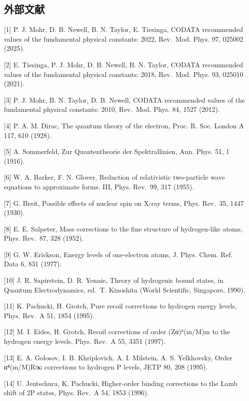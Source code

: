 \documentclass[
  a4paper,
]{ltjsarticle}
\begin{document}
\subsection{外部文献}\label{ux5916ux90e8ux6587ux732e}

{[}1{]} P. J. Mohr, D. B. Newell, B. N. Taylor, E. Tiesinga, CODATA
recommended values of the fundamental physical constants: 2022,
Rev.~Mod. Phys. 97, 025002 (2025).

{[}2{]} E. Tiesinga, P. J. Mohr, D. B. Newell, B. N. Taylor, CODATA
recommended values of the fundamental physical constants: 2018,
Rev.~Mod. Phys. 93, 025010 (2021).

{[}3{]} P. J. Mohr, B. N. Taylor, D. B. Newell, CODATA recommended
values of the fundamental physical constants: 2010, Rev.~Mod. Phys. 84,
1527 (2012).

{[}4{]} P. A. M. Dirac, The quantum theory of the electron, Proc. R.
Soc. London A 117, 610 (1928).

{[}5{]} A. Sommerfeld, Zur Quantentheorie der Spektrallinien, Ann. Phys.
51, 1 (1916).

{[}6{]} W. A. Barker, F. N. Glover, Reduction of relativistic
two-particle wave equations to approximate forms. III, Phys. Rev.~99,
317 (1955).

{[}7{]} G. Breit, Possible effects of nuclear spin on X-ray terms, Phys.
Rev.~35, 1447 (1930).

{[}8{]} E. E. Salpeter, Mass corrections to the fine structure of
hydrogen-like atoms, Phys. Rev.~87, 328 (1952).

{[}9{]} G. W. Erickson, Energy levels of one-electron atoms, J. Phys.
Chem. Ref. Data 6, 831 (1977).

{[}10{]} J. R. Sapirstein, D. R. Yennie, Theory of hydrogenic bound
states, in Quantum Electrodynamics, ed.~T. Kinoshita (World Scientific,
Singapore, 1990).

{[}11{]} K. Pachucki, H. Grotch, Pure recoil corrections to hydrogen
energy levels, Phys. Rev.~A 51, 1854 (1995).

{[}12{]} M. I. Eides, H. Grotch, Recoil corrections of order (Zα)⁶(m/M)m
to the hydrogen energy levels, Phys. Rev.~A 55, 3351 (1997).

{[}13{]} E. A. Golosov, I. B. Khriplovich, A. I. Milstein, A. S.
Yelkhovsky, Order α⁴(m/M)R∞ corrections to hydrogen P levels, JETP 80,
208 (1995).

{[}14{]} U. Jentschura, K. Pachucki, Higher-order binding corrections to
the Lamb shift of 2P states, Phys. Rev.~A 54, 1853 (1996).
\end{document}
